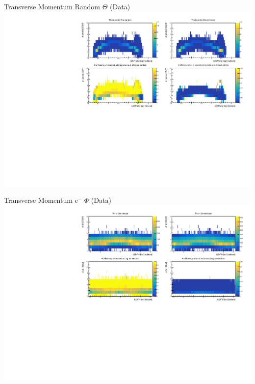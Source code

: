 \documentclass[10pt]{beamer}
\begin{document}
\begin{frame}{Transverse Momentum Random $\Theta$ (Data)}
	\centering
	\includegraphics[width=\textwidth]{Momentum/tMThetaRandom_Data}
\end{frame}
\begin{frame}{Transverse Momentum $\textrm{e}^-$ $\Phi$ (Data)}
	\centering
	\includegraphics[width=\textwidth]{Momentum/tMPhiem_Data}
\end{frame}
\end{document}
